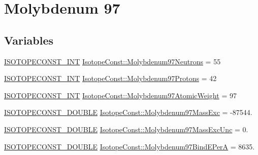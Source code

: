 \hypertarget{group___isotope_const-_molybdenum-_mo97}{}\section{Molybdenum 97}
\label{group___isotope_const-_molybdenum-_mo97}
\subsection*{Variables}
\begin{DoxyCompactItemize}
\item 
\mbox{\hyperlink{group___isotope_const-_macros_ga5f18360b3e99483a35c32d789e62621c}{I\+S\+O\+T\+O\+P\+E\+C\+O\+N\+S\+T\+\_\+\+I\+NT}} \mbox{\hyperlink{group___isotope_const-_molybdenum-_mo97_ga7db32c38f4c1adc421229ca070bc8629}{Isotope\+Const\+::\+Molybdenum97\+Neutrons}} = 55
\item 
\mbox{\hyperlink{group___isotope_const-_macros_ga5f18360b3e99483a35c32d789e62621c}{I\+S\+O\+T\+O\+P\+E\+C\+O\+N\+S\+T\+\_\+\+I\+NT}} \mbox{\hyperlink{group___isotope_const-_molybdenum-_mo97_ga3825096a1f967d51b974a0ddf04e6f70}{Isotope\+Const\+::\+Molybdenum97\+Protons}} = 42
\item 
\mbox{\hyperlink{group___isotope_const-_macros_ga5f18360b3e99483a35c32d789e62621c}{I\+S\+O\+T\+O\+P\+E\+C\+O\+N\+S\+T\+\_\+\+I\+NT}} \mbox{\hyperlink{group___isotope_const-_molybdenum-_mo97_ga28e3b011021233042806078fd25da700}{Isotope\+Const\+::\+Molybdenum97\+Atomic\+Weight}} = 97
\item 
\mbox{\hyperlink{group___isotope_const-_macros_ga8f45a7272ce02c0b4c65c44636ed719a}{I\+S\+O\+T\+O\+P\+E\+C\+O\+N\+S\+T\+\_\+\+D\+O\+U\+B\+LE}} \mbox{\hyperlink{group___isotope_const-_molybdenum-_mo97_gad69f288614c8f9030727e1fc13e4879f}{Isotope\+Const\+::\+Molybdenum97\+Mass\+Exc}} = -\/87544.
\item 
\mbox{\hyperlink{group___isotope_const-_macros_ga8f45a7272ce02c0b4c65c44636ed719a}{I\+S\+O\+T\+O\+P\+E\+C\+O\+N\+S\+T\+\_\+\+D\+O\+U\+B\+LE}} \mbox{\hyperlink{group___isotope_const-_molybdenum-_mo97_gaa0740a296c145ccd40304d7759af54e5}{Isotope\+Const\+::\+Molybdenum97\+Mass\+Exc\+Unc}} = 0.
\item 
\mbox{\hyperlink{group___isotope_const-_macros_ga8f45a7272ce02c0b4c65c44636ed719a}{I\+S\+O\+T\+O\+P\+E\+C\+O\+N\+S\+T\+\_\+\+D\+O\+U\+B\+LE}} \mbox{\hyperlink{group___isotope_const-_molybdenum-_mo97_ga9e62f4d73768cb8c68e1abbffb0e9b11}{Isotope\+Const\+::\+Molybdenum97\+Bind\+E\+PerA}} = 8635.
\item 

\end{DoxyCompactItemize}
